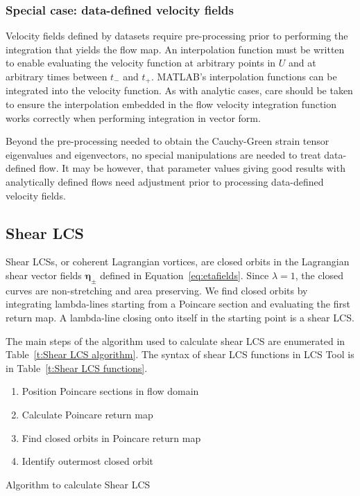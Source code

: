 \documentclass{article}
\begin{document}
\subsubsection{Special case: data-defined velocity fields}

Velocity fields defined by datasets require pre-processing prior to performing the integration that yields the flow map. An interpolation function must be written to enable evaluating the velocity function at arbitrary points in $U$ and at arbitrary times between $t_-$ and $t_+$. MATLAB's interpolation functions can be integrated into the velocity function. As with analytic cases, care should be taken to ensure the interpolation embedded in the flow velocity integration function works correctly when performing integration in vector form.

Beyond the pre-processing needed to obtain the Cauchy-Green strain tensor eigenvalues and eigenvectors, no special manipulations are needed to treat data-defined flow. It may be however, that parameter values giving good results with analytically defined flows need adjustment prior to processing data-defined velocity fields.

\subsection{Shear LCS}

Shear LCSs, or coherent Lagrangian vortices, are closed orbits in the Lagrangian shear vector fields $\boldsymbol \eta_{\pm}$ defined in Equation~\eqref{eq:etafields}. Since $\lambda = 1$, the closed curves are non-stretching and area preserving. We find closed orbits by integrating lambda-lines starting from a Poincare section and evaluating the first return map. A lambda-line closing onto itself in the starting point is a shear LCS.

The main steps of the algorithm used to calculate shear LCS are enumerated in Table~\ref{t:Shear LCS algorithm}. The syntax of shear LCS functions in LCS Tool is in Table~\ref{t:Shear LCS functions}.

\begin{table}
\begin{center}
\begin{enumerate}
\item Position Poincare sections in flow domain
\item Calculate Poincare return map
\item Find closed orbits in Poincare return map
\item Identify outermost closed orbit
\end{enumerate}
\end{center}
\caption{Algorithm to calculate Shear LCS}
\label{t:Shear LCS algorithm}
\end{table}
\end{document}
